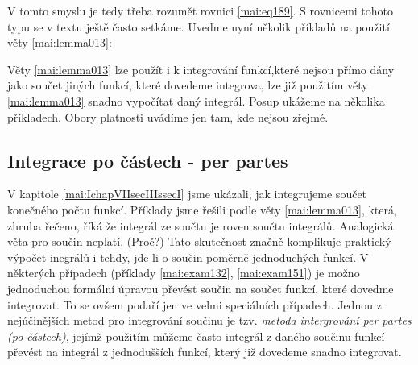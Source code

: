       V tomto smyslu je tedy třeba rozumět rovnici \eqref{mai:eq189}. S rovnicemi tohoto typu se v
      textu ještě často setkáme. Uveďme nyní několik příkladů na použití věty \eqref{mai:lemma013}:
      
      
      
      
      

      Věty \ref{mai:lemma013} lze použít i k integrování funkcí,které nejsou přímo dány jako součet
      jiných funkcí, které dovedeme integrova, lze již použitím věty \ref{mai:lemma013} snadno
      vypočítat daný integrál. Posup ukážeme na několika příkladech. Obory platnosti uvádíme jen
      tam, kde nejsou zřejmé. 
      
      
      
      
      
      
      
      
      
      
    \newpage
    \subsection{Integrace po částech - per partes}\label{mai:IchapVIIsecIIIssecII}
      V kapitole \ref{mai:IchapVIIsecIIIssecI} jsme ukázali, jak integrujeme součet konečného počtu
      funkcí. Příklady jsme řešili podle věty \ref{mai:lemma013}, která, zhruba řečeno, říká že
      integrál ze součtu je roven součtu integrálů. Analogická věta pro součin neplatí. (Proč?) Tato
      skutečnost značně komplikuje praktický výpočet inegrálů i tehdy, jde-li o součin poměrně
      jednoduchých funkcí. V některých případech (příklady \ref{mai:exam132}, \ref{mai:exam151})
      je možno jednoduchou formální úpravou převést součin na součet funkcí, které dovedme
      integrovat. To se ovšem podaří jen ve velmi speciálních případech. Jednou z nejúčinějších
      metod pro integrování součinu je tzv. \emph{metoda intergrování per partes (po částech)},
      jejímž použitím můžeme často integrál z daného součinu funkcí převést na integrál z
      jednodušších funkcí, který již dovedeme snadno integrovat. 
      
